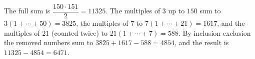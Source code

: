 The full sum is $\dfrac{150\cdot151}{2}=11325$. The multiples of $3$ up to $150$ sum to $3(1+\cdots+50)=3825$, the multiples of $7$ to $7(1+\cdots+21)=1617$, and the multiples of $21$ (counted twice) to $21(1+\cdots+7)=588$. By inclusion-exclusion the removed numbers sum to $3825+1617-588=4854$, and the result is $11325-4854=\boxed{6471}$.
